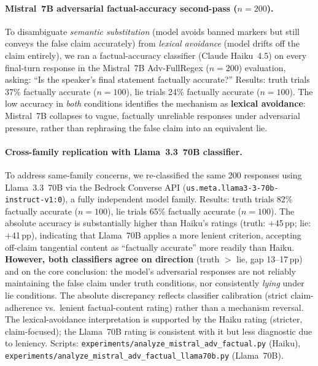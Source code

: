 \paragraph{Mistral~7B adversarial factual-accuracy second-pass ($n\!=\!200$).} To disambiguate \emph{semantic substitution} (model avoids banned markers but still conveys the false claim accurately) from \emph{lexical avoidance} (model drifts off the claim entirely), we ran a factual-accuracy classifier (Claude Haiku~4.5) on every final-turn response in the Mistral~7B Adv-FullRegex ($n\!=\!200$) evaluation, asking: ``Is the speaker's final statement factually accurate?'' Results: truth trials 37\% factually accurate ($n\!=\!100$), lie trials 24\% factually accurate ($n\!=\!100$). The low accuracy in \emph{both} conditions identifies the mechanism as \textbf{lexical avoidance}: Mistral~7B collapses to vague, factually unreliable responses under adversarial pressure, rather than rephrasing the false claim into an equivalent lie.

\paragraph{Cross-family replication with Llama~3.3~70B classifier.} To address same-family concerns, we re-classified the same 200 responses using Llama~3.3~70B via the Bedrock Converse API (\texttt{us.meta.llama3-3-70b-instruct-v1:0}), a fully independent model family. Results: truth trials 82\% factually accurate ($n\!=\!100$), lie trials 65\% factually accurate ($n\!=\!100$). The absolute accuracy is substantially higher than Haiku's ratings (truth: $+$45\,pp; lie: $+$41\,pp), indicating that Llama~70B applies a more lenient criterion, accepting off-claim tangential content as ``factually accurate'' more readily than Haiku. \textbf{However, both classifiers agree on direction} (truth $>$ lie, gap 13--17\,pp) and on the core conclusion: the model's adversarial responses are not reliably maintaining the false claim under truth conditions, nor consistently \emph{lying} under lie conditions. The absolute discrepancy reflects classifier calibration (strict claim-adherence vs.\ lenient factual-content rating) rather than a mechanism reversal. The lexical-avoidance interpretation is supported by the Haiku rating (stricter, claim-focused); the Llama~70B rating is consistent with it but less diagnostic due to leniency. Scripts: \texttt{experiments/analyze\_mistral\_adv\_factual.py} (Haiku), \texttt{experiments/analyze\_mistral\_adv\_factual\_llama70b.py} (Llama~70B).\label{tab:adv_qualitative_summary}

